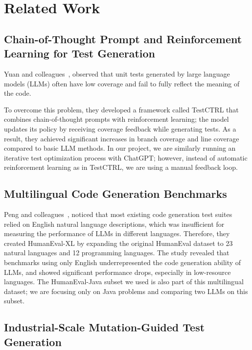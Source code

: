 \section{Related Work}
\label{sec:related}

\subsection{Chain-of-Thought Prompt and Reinforcement Learning for Test Generation}

Yuan and colleagues~\cite{yuan2025testctrl}, observed that unit tests generated by large language models (LLMs) often have low coverage and fail to fully reflect the meaning of the code.

To overcome this problem, they developed a framework called TestCTRL that combines chain-of-thought prompts with reinforcement learning; the model updates its policy by receiving coverage feedback while generating tests.
As a result, they achieved significant increases in branch coverage and line coverage compared to basic LLM methods.
In our project, we are similarly running an iterative test optimization process with ChatGPT; however, instead of automatic reinforcement learning as in TestCTRL, we are using a manual feedback loop.

\subsection{Multilingual Code Generation Benchmarks}

Peng and colleagues~\cite{peng2024humanevalxl}, noticed that most existing code generation test suites relied on English natural language descriptions, which was insufficient for measuring the performance of LLMs in different languages.
Therefore, they created HumanEval-XL by expanding the original HumanEval dataset to 23 natural languages and 12 programming languages.
The study revealed that benchmarks using only English underrepresented the code generation ability of LLMs, and showed significant performance drops, especially in low-resource languages.
The HumanEval-Java subset we used is also part of this multilingual dataset; we are focusing only on Java problems and comparing two LLMs on this subset.

\subsection{Industrial-Scale Mutation-Guided Test Generation}

